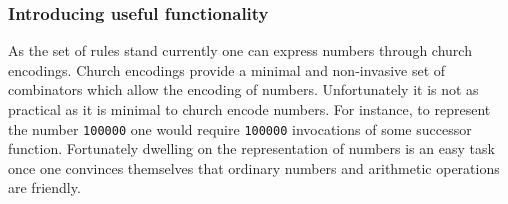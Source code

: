 
\subsubsection{Introducing useful functionality}
As the set of rules stand currently one can express numbers through church encodings.
Church encodings provide a minimal and non-invasive set of combinators which allow the encoding of numbers.
Unfortunately it is not as practical as it is minimal to church encode numbers.
For instance, to represent the number \texttt{100000} one would require \texttt{100000} invocations of some successor function.
Fortunately dwelling on the representation of numbers is an easy task once one convinces themselves that ordinary numbers and arithmetic operations are friendly.

